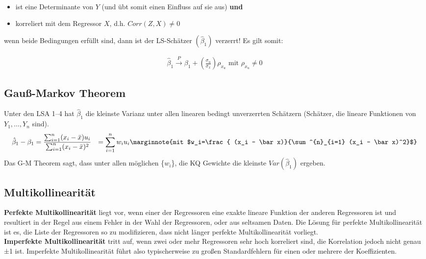 \begin{itemize}
	\item ist eine Determinante von $Y$ (und übt somit einen Einfluss auf sie aus) {\bfseries und}
	\item korreliert mit dem Regressor $X$, d.h. $Corr(Z,X) \neq{0}$
\end{itemize}

wenn beide Bedingungen erfüllt sind, dann ist der LS-Schätzer $(\hat \beta_1)$ verzerrt! Es gilt somit:

\begin{align*}
	\hat \beta_1 \overset{P}{\rightarrow} \beta_1 + \left(
	\frac{\sigma_u}{\sigma_x} \right) \rho_{x_u}\text{~mit~} \rho_{x_u} \neq 0
\end{align*}

\subsection{Gauß-Markov Theorem}
\label{sec:gauss_markov_theorem}
Unter den LSA 1--4 hat $\hat\beta_1$ die kleinste Varianz unter
allen linearen bedingt unverzerrten Schätzern (Schätzer, die lineare
Funktionen von $Y_1, \ldots, Y_n$ sind).
\begin{align*}
	\hat\beta_1 - \beta_1 &= \frac{\sum^{n}_{i=1} (x_i - \bar x)u_i}{\sum^{n}_{i=1} (x_i - \bar x)^2}
&=\sum^{n}_{i=1} w_i u_i\marginnote{mit $w_i=\frac{ (x_i - \bar x)}{\sum^{n}_{i=1} (x_i - \bar x)^2}$}
\end{align*}
Das G-M Theorem sagt, dass unter allen möglichen \{$w_i$\}, die KQ
Gewichte die kleinste $Var(\hat\beta_1)$ ergeben.

\subsection{Multikollinearität}
\label{sec:multikollinearitat}

\textbf{Perfekte Multikollinearität} liegt vor, wenn einer der Regressoren eine exakte
lineare Funktion der anderen Regressoren ist und resultiert in der Regel aus
einem Fehler in der Wahl der Regressoren, oder aus seltsamen Daten. Die Lösung
für perfekte Multikollinearität ist es, die Liste der Regressoren so zu
modifizieren, dass nicht länger perfekte Multikollinearität vorliegt.\\

\textbf{Imperfekte Multikollinearität} tritt auf, wenn zwei oder mehr
Regressoren sehr hoch korreliert sind, die Korrelation jedoch nicht genau ±1
ist. Imperfekte Multikollinearität führt also typischerweise zu großen
Standardfehlern für einen oder mehrere der Koeffizienten.\\

